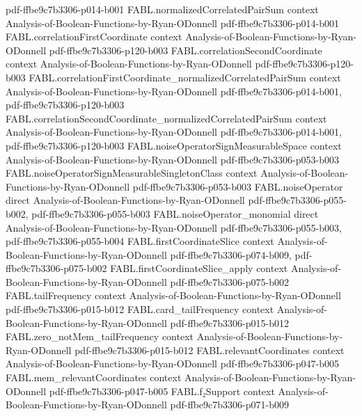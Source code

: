 \begin{theorem}
  {pdf-ffbe9c7b3306-p014-b001}
\proofstep
  {FABL.normalizedCorrelatedPairSum}
  {context}
  {Analysis-of-Boolean-Functions-by-Ryan-ODonnell}
  {pdf-ffbe9c7b3306-p014-b001}
\proofstep
  {FABL.correlationFirstCoordinate}
  {context}
  {Analysis-of-Boolean-Functions-by-Ryan-ODonnell}
  {pdf-ffbe9c7b3306-p120-b003}
\proofstep
  {FABL.correlationSecondCoordinate}
  {context}
  {Analysis-of-Boolean-Functions-by-Ryan-ODonnell}
  {pdf-ffbe9c7b3306-p120-b003}
\proofstep
  {FABL.correlationFirstCoordinate_normalizedCorrelatedPairSum}
  {context}
  {Analysis-of-Boolean-Functions-by-Ryan-ODonnell}
  {pdf-ffbe9c7b3306-p014-b001,
    pdf-ffbe9c7b3306-p120-b003}
\proofstep
  {FABL.correlationSecondCoordinate_normalizedCorrelatedPairSum}
  {context}
  {Analysis-of-Boolean-Functions-by-Ryan-ODonnell}
  {pdf-ffbe9c7b3306-p014-b001,
    pdf-ffbe9c7b3306-p120-b003}
\proofstep
  {FABL.noiseOperatorSignMeasurableSpace}
  {context}
  {Analysis-of-Boolean-Functions-by-Ryan-ODonnell}
  {pdf-ffbe9c7b3306-p053-b003}
\proofstep
  {FABL.noiseOperatorSignMeasurableSingletonClass}
  {context}
  {Analysis-of-Boolean-Functions-by-Ryan-ODonnell}
  {pdf-ffbe9c7b3306-p053-b003}
\proofstep
  {FABL.noiseOperator}
  {direct}
  {Analysis-of-Boolean-Functions-by-Ryan-ODonnell}
  {pdf-ffbe9c7b3306-p055-b002,
    pdf-ffbe9c7b3306-p055-b003}
\proofstep
  {FABL.noiseOperator_monomial}
  {direct}
  {Analysis-of-Boolean-Functions-by-Ryan-ODonnell}
  {pdf-ffbe9c7b3306-p055-b003,
    pdf-ffbe9c7b3306-p055-b004}
\proofstep
  {FABL.firstCoordinateSlice}
  {context}
  {Analysis-of-Boolean-Functions-by-Ryan-ODonnell}
  {pdf-ffbe9c7b3306-p074-b009,
    pdf-ffbe9c7b3306-p075-b002}
\proofstep
  {FABL.firstCoordinateSlice_apply}
  {context}
  {Analysis-of-Boolean-Functions-by-Ryan-ODonnell}
  {pdf-ffbe9c7b3306-p075-b002}
\proofstep
  {FABL.tailFrequency}
  {context}
  {Analysis-of-Boolean-Functions-by-Ryan-ODonnell}
  {pdf-ffbe9c7b3306-p015-b012}
\proofstep
  {FABL.card_tailFrequency}
  {context}
  {Analysis-of-Boolean-Functions-by-Ryan-ODonnell}
  {pdf-ffbe9c7b3306-p015-b012}
\proofstep
  {FABL.zero_notMem_tailFrequency}
  {context}
  {Analysis-of-Boolean-Functions-by-Ryan-ODonnell}
  {pdf-ffbe9c7b3306-p015-b012}
\proofstep
  {FABL.relevantCoordinates}
  {context}
  {Analysis-of-Boolean-Functions-by-Ryan-ODonnell}
  {pdf-ffbe9c7b3306-p047-b005}
\proofstep
  {FABL.mem_relevantCoordinates}
  {context}
  {Analysis-of-Boolean-Functions-by-Ryan-ODonnell}
  {pdf-ffbe9c7b3306-p047-b005}
\proofstep
  {FABL.f₂Support}
  {context}
  {Analysis-of-Boolean-Functions-by-Ryan-ODonnell}
  {pdf-ffbe9c7b3306-p071-b009}
\proofstep

\end{theorem}
